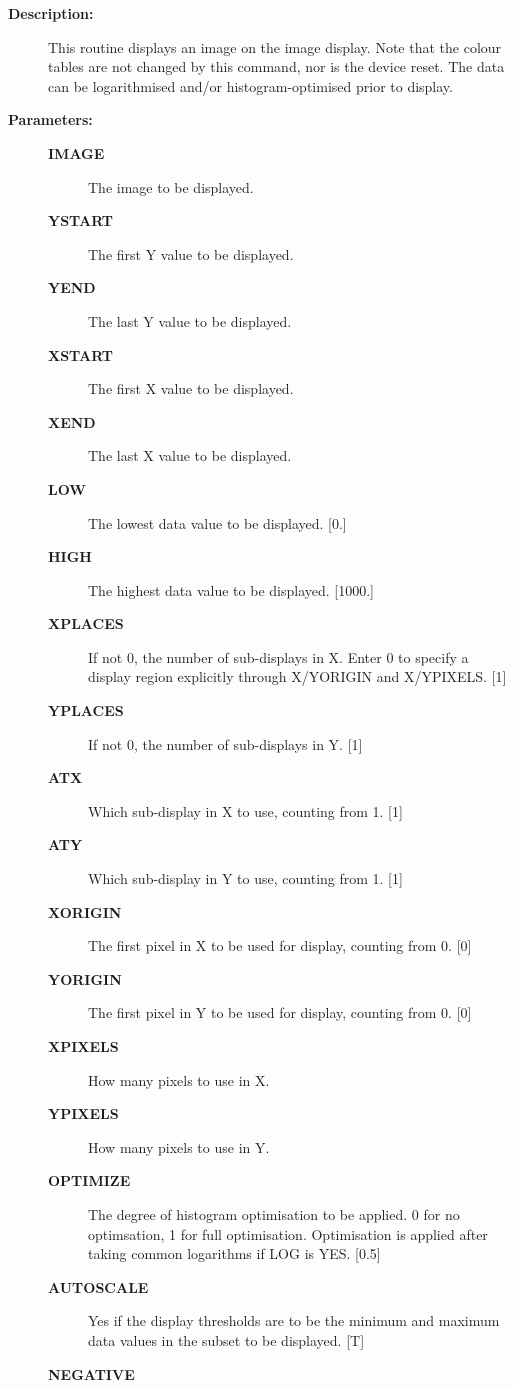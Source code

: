 \begin{description}
\begin{description}
\item [\textbf{Description:}]
 This routine displays an image on the image display. Note that the
 colour tables are not changed by this command, nor is the device
 reset. The data can be logarithmised and/or histogram-optimised
 prior to display.

\item [\textbf{Parameters:}]
\begin{description}
\item [\textbf{IMAGE}]
 The image to be displayed.
\item [\textbf{YSTART}]
 The first Y value to be displayed.
\item [\textbf{YEND}]
 The last Y value to be displayed.
\item [\textbf{XSTART}]
 The first X value to be displayed.
\item [\textbf{XEND}]
 The last X value to be displayed.
\item [\textbf{LOW}]
 The lowest data value to be displayed. [0.]
\item [\textbf{HIGH}]
 The highest data value to be displayed. [1000.]
\item [\textbf{XPLACES}]
 If not 0, the number of sub-displays in X. Enter 0 to specify
 a display region explicitly through X/YORIGIN and X/YPIXELS. [1]
\item [\textbf{YPLACES}]
 If not 0, the number of sub-displays in Y. [1]
\item [\textbf{ATX}]
 Which sub-display in X to use, counting from 1. [1]
\item [\textbf{ATY}]
 Which sub-display in Y to use, counting from 1. [1]
\item [\textbf{XORIGIN}]
 The first pixel in X to be used for display, counting from 0. [0]
\item [\textbf{YORIGIN}]
 The first pixel in Y to be used for display, counting from 0. [0]
\item [\textbf{XPIXELS}]
 How many pixels to use in X.
\item [\textbf{YPIXELS}]
 How many pixels to use in Y.
\item [\textbf{OPTIMIZE}]
 The degree of histogram optimisation to be applied. 0 for no
 optimsation, 1 for full optimisation. Optimisation is applied
 after taking common logarithms if LOG is YES. [0.5]
\item [\textbf{AUTOSCALE}]
 Yes if the display thresholds are to be the minimum and
 maximum data values in the subset to be displayed. [T]
\item [\textbf{NEGATIVE}]

\end{description}
\end{description}
\end{description}
